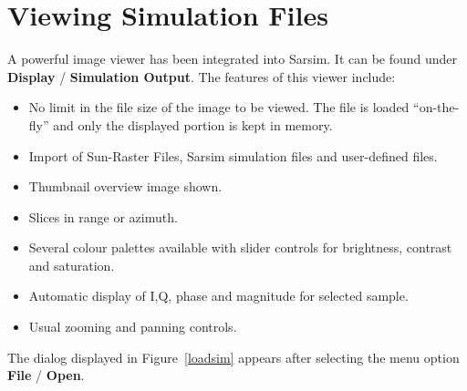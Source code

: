 \section{Viewing Simulation Files}

A powerful image viewer has been integrated into Sarsim. It can be found
under \textbf{Display} / \textbf{Simulation Output}. The features of this
viewer include:

\begin{itemize}
\item  No limit in the file size of the image to be viewed. The file is
loaded ``on-the-fly'' and only the displayed portion is kept in memory.

\item  Import of Sun-Raster Files, Sarsim simulation files and user-defined
files.

\item  Thumbnail overview image shown.

\item  Slices in range or azimuth.

\item  Several colour palettes available with slider controls for
brightness, contrast and saturation.

\item  Automatic display of I,Q, phase and magnitude for selected sample.

\item  Usual zooming and panning controls.
\end{itemize}

The dialog displayed in Figure~\ref{loadsim} appears after selecting the
menu option \textbf{File} / \textbf{Open}.


